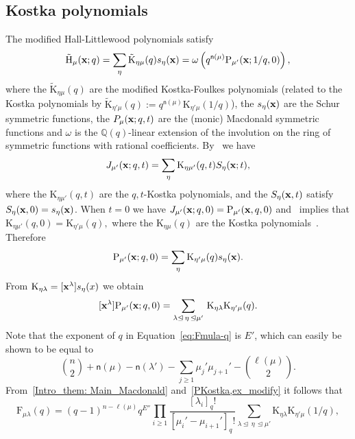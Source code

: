 \documentclass[12pt,a4paper,reqno]{amsart}
\theoremstyle{plain}
\theoremstyle{definition}
\newcommand{\less}{\unlhd}
\newcommand{\1}{\mathds{1}}
\renewcommand{\P}{\mathrm{P}}
\newcommand{\F}{\mathrm{F}}
\newcommand{\HH}{\mathrm{H}}
\newcommand{\K}{{\mathrm{K}}}
\newcommand{\x}{{\bf x}}
\newcommand{\fn}{\mathsf{n}}
\begin{document}
\subsection{Kostka polynomials}
The modified Hall-Littlewood polynomials satisfy
\begin{align}
\label{eq:tildeH=omegaP}
  \tilde{\HH}_\mu(\x;q)=
\sum_{\eta} \tilde{\K}_{\eta\mu}(q)s_\eta(\x)
  =
   \omega \left(q^{\fn(\mu)}\P_{\mu'}(\x; 1/q,0)\right),
\end{align}
where the $\tilde{\K}_{\eta\mu}(q)$ are the modified Kostka-Foulkes polynomials
(related to the Kostka polynomials by 
$\tilde{\K}_{\eta'\mu}(q):=q^{\fn(\mu)}\K_{\eta'\mu}(1/q)$),
the $s_\eta(\x)$ are the Schur symmetric functions,  
the $P_\mu(\x;q,t)$ are the (monic) Macdonald symmetric functions and $\omega$ is the $\mathbb Q(q)$-linear extension of the involution on the ring of symmetric functions with rational coefficients.
By~\cite[p. 354, Eq. (8.11)]{Macdonald}
we have 
$$
J_{\mu'}(\x;q,t)=\sum_{\eta}\K_{\eta\mu'}(q,t)S_\eta(\x;t),
$$
where the $\K_{\eta\mu'}(q,t)$ are the $q,t$-Kostka polynomials, and the $S_\eta(\x,t)$ satisfy  $S_\eta(\x,0) = s_\eta(\x)$. When $t=0$ we have $J_{\mu'}(\x; q,0)=\P_{\mu'}(\x,q,0)$ and~\cite[p.354, Eq. (8.15)]{Macdonald} implies that
$
\K_{\eta\mu'}(q,0)=\K_{\eta'\mu}(q),
$
where the $\K_{\eta\mu}(q)$ are the Kostka polynomials~\cite[Chapter III, Section 6]{Macdonald}.
 Therefore 
\begin{equation}\label{Mac_Schur}
\P_{\mu'}(\x;q,0)=\sum_{\eta}\K_{\eta'\mu}(q)s_\eta(\x). 
\end{equation}
From $\K_{\eta\lambda}=[\x^\lambda]s_\eta(x)$ we obtain 
\begin{equation}\label{PKostka}
[\x^\lambda]\P_{\mu'}(\x;q,0)=\sum_{\lambda\less\,\eta\,\less\mu'}\,\K_{\eta\lambda}\K_{\eta'\mu}(q).
\end{equation}
Note that the exponent of $q$ in Equation~\cref{eq:Fmula-q}
 is $E'$, which can easily be shown to be equal to
\begin{equation}\label{ex_modify}
    \binom{n}{2}+\fn(\mu)-\fn(\lambda')-\sum_{j\geq 1}\mu_j'\mu_{j+1}'-\binom{\ell(\mu)}{2}.
\end{equation}
From~\cref{Intro_them: Main_Macdonald} and~\cref{PKostka,ex_modify} it follows that
\begin{equation}\label{F_Kostka1:Eq}
\F_{\mu\lambda}(q)=(q-1)^{n-\ell(\mu)}q^{E''}\prod_{i\geq 1}\frac{[\lambda_i]_q!}{[\mu_i'-\mu_{i+1}']_q!}\sum_{\lambda\less\,\eta\,\less\mu'}\K_{\eta\lambda}\K_{\eta'\mu}(1/q), 
\end{equation}
\end{document}
